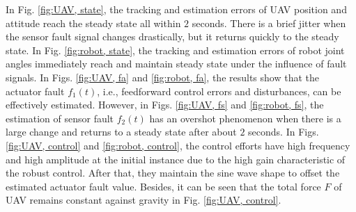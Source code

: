 \documentclass{ieeeaccess}
\begin{document}
In Fig. \ref{fig:UAV, state}, the tracking and estimation errors of UAV position and attitude reach the steady state all within $2$ seconds. There is a brief jitter when the sensor fault signal changes drastically, but it returns quickly to the steady state. In Fig. \ref{fig:robot, state}, the tracking and estimation errors of robot joint angles immediately reach and maintain steady state under the influence of fault signals. In Figs. \ref{fig:UAV, fa} and \ref{fig:robot, fa}, the results show that the actuator fault $f_1(t)$, i.e., feedforward control errors and disturbances, can be effectively estimated. However, in Figs. \ref{fig:UAV, fs} and \ref{fig:robot, fs}, the estimation of sensor fault $f_2(t)$ has an overshot phenomenon when there is a large change and returns to a steady state after about $2$ seconds. In Figs. \ref{fig:UAV, control} and \ref{fig:robot, control}, the control efforts have high frequency and high amplitude at the initial instance due to the high gain characteristic of the robust control. After that, they maintain the sine wave shape to offset the estimated actuator fault value. Besides, it can be seen that the total force $F$ of UAV remains constant against gravity in Fig. \ref{fig:UAV, control}.
\end{document}
